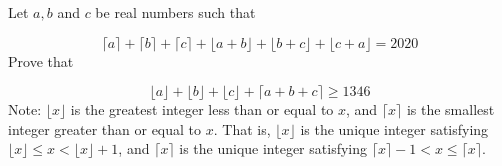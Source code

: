 Let $a, b$ and $c$ be real numbers such that

$$\lceil a \rceil + \lceil b \rceil + \lceil c \rceil + \lfloor a + b \rfloor + \lfloor b + c \rfloor + \lfloor c + a \rfloor = 2020$$
Prove that

$$\lfloor a \rfloor + \lfloor b \rfloor + \lfloor c \rfloor + \lceil a + b + c \rceil \ge 1346$$
Note: $\lfloor x \rfloor$ is the greatest integer less than or equal to $x$, and $\lceil x \rceil$ is the smallest integer greater than or equal to $x$. That is, $\lfloor x \rfloor$ is the unique integer satisfying $\lfloor x \rfloor \le x < \lfloor x \rfloor + 1$, and $\lceil x \rceil$ is the unique integer satisfying $\lceil x \rceil - 1 < x \le \lceil x \rceil$.

